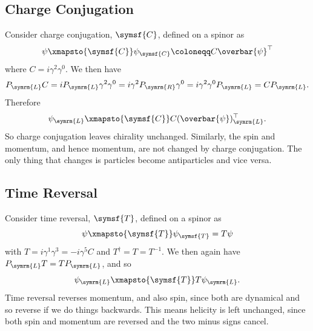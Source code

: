\documentclass[fleqn]{NotesClass}
\newcommand{\diracadjoint}[1]{\overbar{#1}}
\newcommand{\hermit}{\dagger}
\newcommand{\chargeConjugation}{\symsf{C}}
\newcommand{\timeReversal}{\symsf{T}}
\newcommand{\Left}{\symrm{L}}
\newcommand{\Right}{\symrm{R}}
\newcommand{\trans}{\top}
\begin{document}
    \subsection{Charge Conjugation}
    Consider charge conjugation, \(\chargeConjugation\), defined on a spinor as
    \begin{equation}
         \psi \xmapsto{\chargeConjugation} \psi_{\chargeConjugation} \coloneqq C \diracadjoint{\psi}^\trans
    \end{equation}
    where \(C = i \gamma^2 \gamma^0\).
    We then have
    \begin{equation}
        P_{\Left}C = iP_{\Left}\gamma^2\gamma^0 = i\gamma^2P_{\Right}\gamma^0 = i\gamma^2\gamma^0P_{\Left} = CP_{\Left}.
    \end{equation}
    Therefore
    \begin{equation}
        \psi_{\Left} \xmapsto{\chargeConjugation} C(\diracadjoint{\psi})_{\Left}^{\trans}.
    \end{equation}
    So charge conjugation leaves chirality unchanged.
    Similarly, the spin and momentum, and hence momentum, are not changed by charge conjugation.
    The only thing that changes is particles become antiparticles and vice versa.
    
    \subsection{Time Reversal}
    Consider time reversal, \(\timeReversal\), defined on a spinor as
    \begin{equation}
        \psi \xmapsto{\timeReversal} \psi_{\timeReversal} = T\psi
    \end{equation}
    with \(T = i\gamma^1\gamma^3 = -i\gamma^5C\) and \(T^{\hermit} = T = T^{-1}\).
    We then again have \(P_{\Left}T = TP_{\Left}\), and so
    \begin{equation}
        \psi_{\Left} \xmapsto{\timeReversal} T\psi_{\Left}.
    \end{equation}
    Time reversal reverses momentum, and also spin, since both are dynamical and so reverse if we do things backwards.
    This means helicity is left unchanged, since both spin and momentum are reversed and the two minus signs cancel.
    
\end{document}
